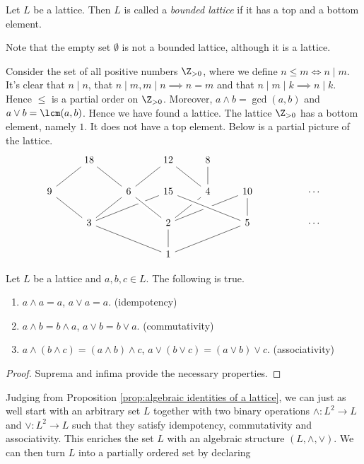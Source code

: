 \begin{definition}
Let $L$ be a lattice. Then $L$ is called a \emph{bounded lattice} if it has a top and a bottom element.
\end{definition}
Note that the empty set $\emptyset$ is not a bounded lattice, although it is a lattice.
\begin{example}
Consider the set of all positive numbers $\Z_{>0}$, where we define $n \leq m \iff n \mid m$. It's clear that $n \mid n$, that $n \mid m, m \mid n \implies n = m$ and that $n \mid m \mid k \implies n \mid k$. Hence $\leq$ is a partial order on $\Z_{>0}$. Moreover, $a \wedge b = \gcd(a,b)$ and $a \vee b = \lcm(a,b)$. Hence we have found a lattice. The lattice $\Z_{>0}$ has a bottom element, namely $1$. It does not have a top element. Below is a partial picture of the lattice.
\[ \begin{tikzcd}
  & 18 & & 12 & 8 \\
9 \arrow[ur, no head] &   & 6 \arrow[ul, no head] \arrow[ur, no head] & 15 & 4 \arrow[ul, no head] \arrow[u, no head] & 10 & & \cdots \\
  & 3 \arrow[ul, no head] \arrow[ur, no head] \arrow[urr, no head] &   & 2 \arrow[ul, no head, crossing over] \arrow[ur, no head] \arrow[urr, no head] &   & 5 \arrow[ull, no head, crossing over] \arrow[u, no head] & & \cdots \\
  &   &   & 1 \arrow[ull, no head] \arrow[u, no head] \arrow[urr, no head] &   &   & & 
\end{tikzcd} \]
\end{example}
\begin{proposition}
\label{prop:algebraic identities of a lattice}
Let $L$ be a lattice and $a,b,c \in L$. The following is true.
\begin{enumerate}
	\item $a \wedge a = a$, $a \vee a =a$. (idempotency)
	\item $a \wedge b = b \wedge a$, $a \vee b = b \vee a$. (commutativity)
	\item $a \wedge (b \wedge c) = (a \wedge b) \wedge c$, $a \vee (b \vee c) = (a \vee b) \vee c$. (associativity)
\end{enumerate}
\end{proposition}
\begin{proof}
Suprema and infima provide the necessary properties.
\end{proof}
Judging from Proposition \ref{prop:algebraic identities of a lattice}, we can just as well start with an arbitrary set $L$ together with two binary operations $\wedge : L^2 \to L$ and $\vee : L^2 \to L$ such that they satisfy idempotency, commutativity and associativity. This enriches the set $L$ with an algebraic structure $(L, \wedge, \vee)$. We can then turn $L$ into a partially ordered set by declaring
